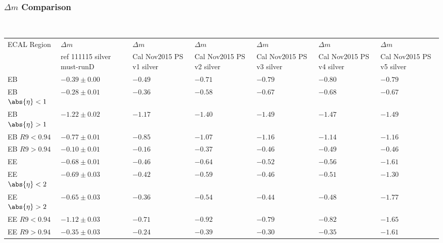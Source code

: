 \documentclass[8pt,serif]{beamer}
\begin{document}

\color{titlecolor}
\usebackgroundtemplate{
	\texttt{[image: ]}%
}
\begin{frame}
  \frametitle{$ \Delta m$ Comparison}
\\


  
  \begin{center}
    \emph{\dataSample}\xspace \invMassVarName

\tiny \begin{tabular}{|l|p{30pt}|p{18pt}|p{18pt}|p{18pt}|p{18pt}|p{18pt}|} \hline  
ECAL Region &  $\Delta m$ &  $\Delta m$ &  $\Delta m$ &  $\Delta m$ &  $\Delta m$ &  $\Delta m$ \\ 
 &  ref 111115 silver must-runD &  Cal Nov2015 PS v1 silver &  Cal Nov2015 PS v2 silver &  Cal Nov2015 PS v3 silver &  Cal Nov2015 PS v4 silver &  Cal Nov2015 PS v5 silver \\ 
\hline           
EB & $-0.39 \pm 0.00$ & $-0.49$ & $-0.71$ & $-0.79$ & $-0.80$ & $-0.79$ \\
EB $\abs{\eta} < 1$ & $-0.28 \pm 0.01$ & $-0.36$ & $-0.58$ & $-0.67$ & $-0.68$ & $-0.67$ \\
EB $\abs{\eta} > 1$ & $-1.22 \pm 0.02$ & $-1.17$ & $-1.40$ & $-1.49$ & $-1.47$ & $-1.49$ \\
EB $R9 < 0.94$ & $-0.77 \pm 0.01$ & $-0.85$ & $-1.07$ & $-1.16$ & $-1.14$ & $-1.16$ \\
EB $R9 > 0.94$ & $-0.10 \pm 0.01$ & $-0.16$ & $-0.37$ & $-0.46$ & $-0.49$ & $-0.46$ \\
EE & $-0.68 \pm 0.01$ & $-0.46$ & $-0.64$ & $-0.52$ & $-0.56$ & $-1.61$ \\
EE $\abs{\eta} < 2$ & $-0.69 \pm 0.03$ & $-0.42$ & $-0.59$ & $-0.46$ & $-0.51$ & $-1.30$ \\
EE $\abs{\eta} > 2$ & $-0.65 \pm 0.03$ & $-0.36$ & $-0.54$ & $-0.44$ & $-0.48$ & $-1.77$ \\
EE $R9 < 0.94$ & $-1.12 \pm 0.03$ & $-0.71$ & $-0.92$ & $-0.79$ & $-0.82$ & $-1.65$ \\
EE $R9 > 0.94$ & $-0.35 \pm 0.03$ & $-0.24$ & $-0.39$ & $-0.30$ & $-0.35$ & $-1.61$ \\
\hline  
\end{tabular} 
  \end{center}


\end{frame}
\end{document}
